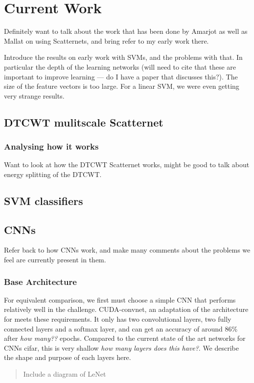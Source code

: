 \chapter{Current Work}\label{ch:current_work}
Definitely want to talk about the work that has been done by Amarjot as well as
Mallat on using Scatternets, and bring refer to my early work there.

Introduce the results on early work with SVMs, and the problems with that. In
particular the depth of the learning networks (will need to cite that these are
important to improve learning --- do I have a paper that discusses this?). The
size of the feature vectors is too large. For a linear SVM, we were even
getting very strange results.

\section{DTCWT mulitscale Scatternet}
\begin{figure}
  \centering
    \resizebox{1.1\textwidth}{!}{}
\end{figure}
\subsection{Analysing how it works}
Want to look at how the DTCWT Scatternet works, might be good to talk about
energy splitting of the DTCWT.

\section{SVM classifiers}

\section{CNNs}
Refer back to how CNNs work, and make many comments about the problems we feel
are currently present in them.
\subsection{Base Architecture}
For equivalent comparison, we first must choose a simple CNN that performs
relatively well in the \cifar challenge. CUDA-convnet\cite{CUDA}, an adaptation
of the \lenet \cite{LeNet} architecture for \cifar meets these requirements. It
only has two convolutional layers, two fully connected layers and a softmax
layer, and can get an accuracy of around 86\% after \emph{how many??} epochs.
Compared to the current state of the art networks for CNNs \cite{ResNET} cifar, 
this is very shallow \emph{how many layers does this have?}. We describe the
shape and purpose of each layers here.
\begin{quote}
Include a diagram of LeNet
\end{quote}

